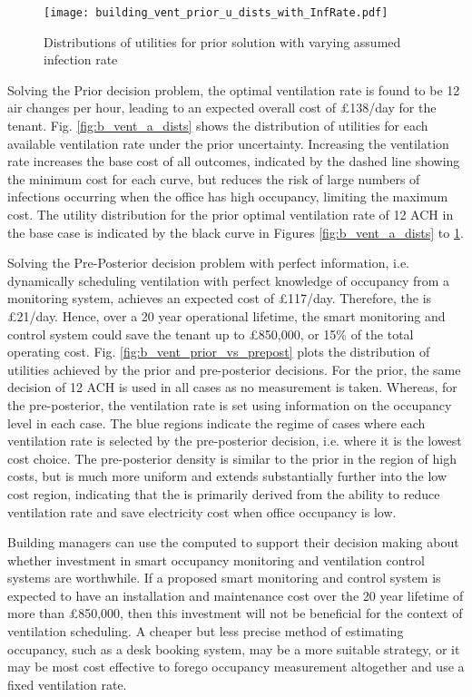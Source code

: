\begin{figure}[p]
    \centering
    \texttt{[image: building\_vent\_prior\_u\_dists\_with\_InfRate.pdf]}
    \caption{Distributions of utilities for prior solution with varying assumed infection rate} \label{fig:b_vent_sensitivity}
\end{figure}

Solving the Prior decision problem, the optimal ventilation rate is found to be 12 air changes per hour, leading to an expected overall cost of £138/day for the tenant. Fig. \ref{fig:b_vent_a_dists} shows the distribution of utilities for each available ventilation rate under the prior uncertainty. Increasing the ventilation rate increases the base cost of all outcomes, indicated by the dashed line showing the minimum cost for each curve, but reduces the risk of large numbers of infections occurring when the office has high occupancy, limiting the maximum cost. The utility distribution for the prior optimal ventilation rate of 12 ACH in the base case is indicated by the black curve in Figures \ref{fig:b_vent_a_dists} to \ref{fig:b_vent_sensitivity}.

Solving the Pre-Posterior decision problem with perfect information, i.e. dynamically scheduling ventilation with perfect knowledge of occupancy from a monitoring system, achieves an expected cost of £117/day. Therefore, the  is £21/day. Hence, over a 20 year operational lifetime, the smart monitoring and control system could save the tenant up to £850,000, or 15\% of the total operating cost. Fig. \ref{fig:b_vent_prior_vs_prepost} plots the distribution of utilities achieved by the prior and pre-posterior decisions. For the prior, the same decision of 12 ACH is used in all cases as no measurement is taken. Whereas, for the pre-posterior, the ventilation rate is set using information on the occupancy level in each case. The blue regions indicate the regime of cases where each ventilation rate is selected by the pre-posterior decision, i.e. where it is the lowest cost choice. The pre-posterior density is similar to the prior in the region of high costs, but is much more uniform and extends substantially further into the low cost region, indicating that the  is primarily derived from the ability to reduce ventilation rate and save electricity cost when office occupancy is low.

Building managers can use the computed  to support their decision making about whether investment in smart occupancy monitoring and ventilation control systems are worthwhile. If a proposed smart monitoring and control system is expected to have an installation and maintenance cost over the 20 year lifetime of more than £850,000, then this investment will not be beneficial for the context of ventilation scheduling. A cheaper but less precise method of estimating occupancy, such as a desk booking system, may be a more suitable strategy, or it may be most cost effective to forego occupancy measurement altogether and use a fixed ventilation rate.


